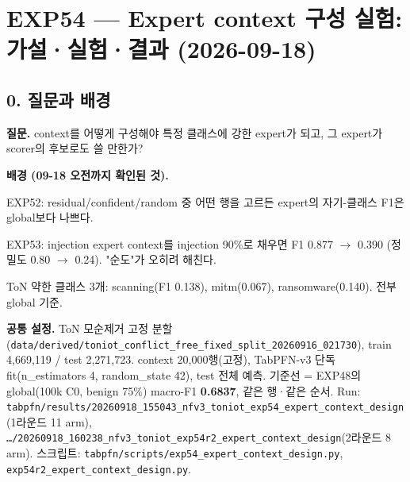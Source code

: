 \section{EXP54 — Expert context 구성 실험: 가설·실험·결과 (2026-09-18)}
\subsection{0. 질문과 배경}
\textbf{질문.} context를 어떻게 구성해야 특정 클래스에 강한 expert가 되고, 그 expert가 scorer의 후보로도 쓸 만한가?

\textbf{배경 (09-18 오전까지 확인된 것).}

\par\noindent \textbullet\enspace EXP52: residual/\allowbreak{}confident/\allowbreak{}random 중 어떤 행을 고르든 expert의 자기-클래스 F1은 global보다 나쁘다.


\par\noindent \textbullet\enspace EXP53: injection expert context를 injection 90\%로 채우면 F1 0.877  \ensuremath{\rightarrow}  0.390 (정밀도 0.80  \ensuremath{\rightarrow}  0.24). "순도"가 오히려 해친다.


\par\noindent \textbullet\enspace ToN 약한 클래스 3개: scanning(F1 0.138), mitm(0.067), ransomware(0.140). 전부 global 기준.


\textbf{공통 설정.} ToN 모순제거 고정 분할(\texttt{data/\allowbreak{}\allowbreak{}der\allowbreak{}ived/\allowbreak{}\allowbreak{}ton\allowbreak{}iot\_\allowbreak{}\allowbreak{}conf\allowbreak{}lict\_\allowbreak{}\allowbreak{}fre\allowbreak{}e\_\allowbreak{}\allowbreak{}fixed\_\allowbreak{}\allowbreak{}split\_\allowbreak{}\allowbreak{}20\allowbreak{}260916\_\allowbreak{}\allowbreak{}0\allowbreak{}21730}), train 4,669,119 /\allowbreak{} test 2,271,723. context 20,000행(고정), TabPFN-v3 단독 fit(n\_\allowbreak{}estimators 4, random\_\allowbreak{}state 42), test 전체 예측. 기준선 =\allowbreak{} EXP48의 global(100k C0, benign 75\%) macro-F1 \textbf{0.6837}, 같은 행·같은 순서. Run: \texttt{tabpfn/\allowbreak{}\allowbreak{}r\allowbreak{}esults/\allowbreak{}\allowbreak{}2\allowbreak{}0260918\_\allowbreak{}\allowbreak{}155043\_\allowbreak{}\allowbreak{}n\allowbreak{}fv3\_\allowbreak{}\allowbreak{}toni\allowbreak{}ot\_\allowbreak{}\allowbreak{}exp54\allowbreak{}\_\allowbreak{}\allowbreak{}expert\_\allowbreak{}\allowbreak{}context\_\allowbreak{}\allowbreak{}design}(1라운드 11 arm), \texttt{…/\allowbreak{}\allowbreak{}202609\allowbreak{}18\_\allowbreak{}\allowbreak{}16023\allowbreak{}8\_\allowbreak{}\allowbreak{}nfv3\_\allowbreak{}\allowbreak{}t\allowbreak{}oniot\_\allowbreak{}\allowbreak{}ex\allowbreak{}p54r2\_\allowbreak{}\allowbreak{}ex\allowbreak{}pert\_\allowbreak{}\allowbreak{}con\allowbreak{}text\_\allowbreak{}\allowbreak{}des\allowbreak{}ign}(2라운드 8 arm). 스크립트: \texttt{tabpfn/\allowbreak{}\allowbreak{}s\allowbreak{}cripts/\allowbreak{}\allowbreak{}e\allowbreak{}xp54\_\allowbreak{}\allowbreak{}exp\allowbreak{}ert\_\allowbreak{}\allowbreak{}cont\allowbreak{}ext\_\allowbreak{}\allowbreak{}desi\allowbreak{}gn.\allowbreak{}py}, \texttt{exp54r2\_\allowbreak{}\allowbreak{}expert\_\allowbreak{}\allowbreak{}c\allowbreak{}ontext\_\allowbreak{}\allowbreak{}d\allowbreak{}esign.\allowbreak{}py\allowbreak{}}.


